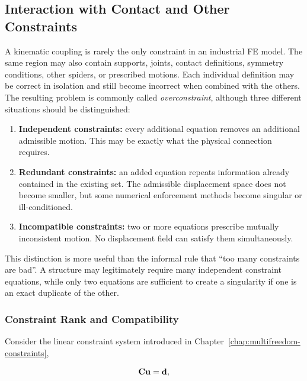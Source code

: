 \subsection{Interaction with Contact and Other Constraints}\label{sec:constraint-interaction}

A kinematic coupling is rarely the only constraint in an industrial FE model.
The same region may also contain supports, joints, contact definitions, symmetry
conditions, other spiders, or prescribed motions. Each individual definition may
be correct in isolation and still become incorrect when combined with the others.
The resulting problem is commonly called \emph{overconstraint}, although three
different situations should be distinguished:

\begin{enumerate}
    \item \textbf{Independent constraints:} every additional equation removes an
          additional admissible motion. This may be exactly what the physical
          connection requires.
    \item \textbf{Redundant constraints:} an added equation repeats information
          already contained in the existing set. The admissible displacement
          space does not become smaller, but some numerical enforcement methods
          become singular or ill-conditioned.
    \item \textbf{Incompatible constraints:} two or more equations prescribe
          mutually inconsistent motion. No displacement field can satisfy them
          simultaneously.
\end{enumerate}

This distinction is more useful than the informal rule that ``too many
constraints are bad''. A structure may legitimately require many independent
constraint equations, while only two equations are sufficient to create a
singularity if one is an exact duplicate of the other.

\subsubsection{Constraint Rank and Compatibility}

Consider the linear constraint system introduced in
Chapter~\ref{chap:multifreedom-constraints},

\begin{equation}\label{constraint-interaction-general}
    \mathbf{C}\mathbf{u}=\mathbf{d},
\end{equation}

